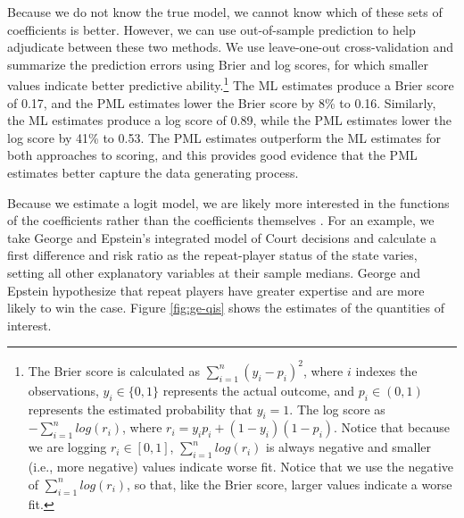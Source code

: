 \documentclass[12pt]{article}
\begin{document}
Because we do not know the true model, we cannot know which of these sets of coefficients is better.
However, we can use out-of-sample prediction to help adjudicate between these two methods.
We use leave-one-out cross-validation and summarize the prediction errors using Brier and log scores, for which smaller values indicate better predictive ability.\footnote{The Brier score is calculated as $\sum_{i = 1}^n (y_i - p_i)^2$, where $i$ indexes the observations, $y_i \in \{0, 1\}$ represents the actual outcome, and $p_i \in (0, 1)$ represents the estimated probability that $y_i = 1$.
The log score as $-\sum_{i = 1}^n log(r_i)$, where $r_i = y_i p_i + (1 - y_i)(1 - p_i)$.
Notice that because we are logging $r_i \in [0, 1]$, $\sum_{i = 1}^n log(r_i)$ is always negative and smaller (i.e., more negative) values indicate worse fit.
Notice that we use the negative of $\sum_{i = 1}^n log(r_i)$, so that, like the Brier score, larger values indicate a worse fit.}
The ML estimates produce a Brier score of 0.17, and the PML estimates lower the Brier score by 8\% to 0.16.
Similarly, the ML estimates produce a log score of 0.89, while the PML estimates lower the log score by 41\% to 0.53.
The PML estimates outperform the ML estimates for both approaches to scoring, and this provides good evidence that the PML estimates better capture the data generating process.

Because we estimate a logit model, we are likely more interested in the functions of the coefficients rather than the coefficients themselves \citep{KingTomzWittenberg2000}.
For an example, we take George and Epstein's integrated model of Court decisions and calculate a first difference and risk ratio as the repeat-player status of the state varies, setting all other explanatory variables at their sample medians.
George and Epstein hypothesize that repeat players have greater expertise and are more likely to win the case.
Figure \ref{fig:ge-qis} shows the estimates of the quantities of interest.
\end{document}
